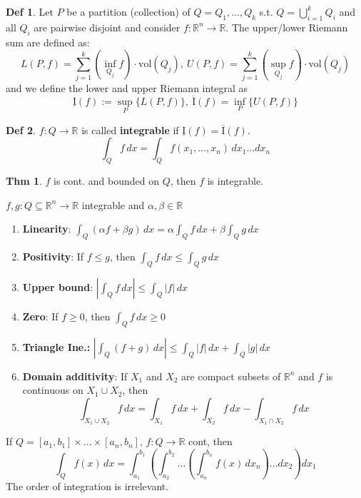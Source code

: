 \documentclass[a4paper, 10pt]{article}
\theoremstyle{definition}
\newtheorem*{theorem}{Thm}
\newtheorem*{definition}{Def}
\newcommand{\R}{\mathbb{R}}
\begin{document}
\begin{definition}
    Let \(P\) be a partition (collection) of \(Q = Q_1, \ldots, Q_k\) s.t. \(Q = \bigcup_{i=1}^k Q_i\) and all \(Q_i\) are pairwise disjoint and consider \(f: \R^n \to \R\).
    The upper/lower Riemann sum are defined as:
    \[L(P, f) = \sum_{j = 1}^k (\inf_{Q_j} f) \cdot \text{vol}(Q_j), \ U(P, f) = \sum_{j = 1}^k (\sup_{Q_j} f) \cdot \text{vol}(Q_j)\]
    and we define the lower and upper Riemann integral as
    \[\underline{\text{I}}(f) := \sup_P \{L(P, f)\}, \ \overline{\text{I}}(f) = \inf_P \{U(P, f)\}\]
\end{definition}

\begin{definition}
    \(f: Q \to \R\) is called \textbf{integrable} if \(\underline{\text{I}}(f) = \overline{\text{I}}(f)\).
    \[\int_Q f \,dx = \int_Q f(x_1, \ldots, x_n) \, dx_1 \ldots dx_n\]
\end{definition}

\begin{theorem}
    \(f\) is cont. and bounded on \(Q\), then \(f\) is integrable.
\end{theorem}

\begin{ntheorem*}[Properties] \(f,g : Q \subseteq \R^n \to \R\) integrable and \(\alpha, \beta \in \R\)
    \begin{enumerate}[leftmargin=15pt]
        \item \textbf{Linearity}: \(\int_Q(\alpha f + \beta g) \, dx = \alpha \int_Q f \, dx + \beta \int_Q g \,dx\)
        \item \textbf{Positivity}: If \(f \leq g\), then \(\int_Q f \, dx \leq \int_Q g \, dx\)
        \item \textbf{Upper bound}: \(| \int_Q f \, dx | \leq \int_Q |f| \, dx\)
        \item \textbf{Zero}: If \(f \geq 0\), then \(\int_Q f \, dx \geq 0\)
        \item \textbf{Triangle Ine.:} \(| \int_Q (f + g) \, dx | \leq \int_Q |f| \, dx + \int_Q |g| \, dx\)
        \item \textbf{Domain additivity}: If \(X_1\) and \(X_2\) are compact subsets of \(\R^n\) and \(f\) is continuous on \(X_1 \cup X_2\), then
        \[\int_{X_1 \cup X_2} f \, dx = \int_{X_1} f \, dx + \int_{X_2} f \, dx - \int_{X_1 \cap X_2} f \, dx\]
    \end{enumerate}
\end{ntheorem*}

\begin{ntheorem*}
    If \(Q = [a_1, b_1] \times \ldots \times [a_n, b_n]\), \(f: Q \to \R\) cont, then
    \[\int_Q f(x) \, dx = \int_{a_1}^{b_1} \left(\int_{a_2}^{b_2} \ldots \left( \int_{a_n}^{b_n} f(x) \, dx_n \right) \ldots dx_2\right) dx_1\]
    The order of integration is irrelevant.
\end{ntheorem*}
\end{document}
